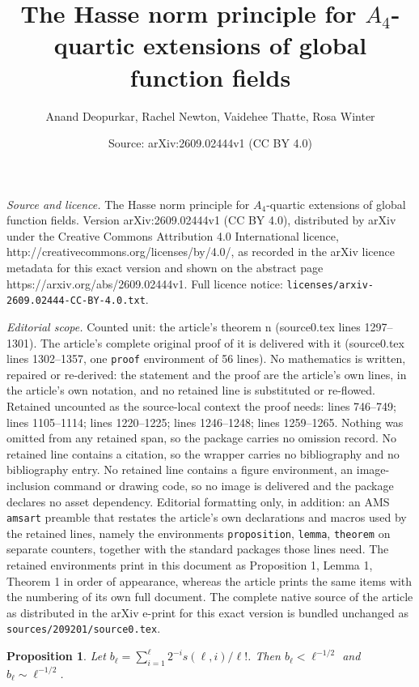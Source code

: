 \documentclass[10pt,a4paper]{amsart}
\title{The Hasse norm principle for $A_4$-quartic extensions of global function fields}
\author{Anand Deopurkar, Rachel Newton, Vaidehee Thatte, Rosa Winter}
\date{Source: arXiv:2609.02444v1 (CC BY 4.0)}
\newtheorem{proposition}{Proposition}
\begin{document}
\maketitle

\noindent\emph{Source and licence.} The Hasse norm principle for $A_4$-quartic extensions of global function fields. Version arXiv:2609.02444v1 (CC BY 4.0), distributed by arXiv under the Creative Commons Attribution 4.0 International licence, http://creativecommons.org/licenses/by/4.0/, as recorded in the arXiv licence metadata for this exact version and shown on the abstract page https://arxiv.org/abs/2609.02444v1. Full licence notice: \texttt{licenses/arxiv-2609.02444-CC-BY-4.0.txt}.\par\smallskip

\noindent\textit{Editorial scope.} Counted unit: the article's theorem n (source0.tex lines 1297--1301). The article's complete original proof of it is delivered with it (source0.tex lines 1302--1357, one \texttt{proof} environment of 56 lines). No mathematics is written, repaired or re-derived: the statement and the proof are the article's own lines, in the article's own notation, and no retained line is substituted or re-flowed.  Retained uncounted as the source-local context the proof needs: lines 746--749; lines 1105--1114; lines 1220--1225; lines 1246--1248; lines 1259--1265.  Nothing was omitted from any retained span, so the package carries no omission record.  No retained line contains a citation, so the wrapper carries no bibliography and no bibliography entry.  No retained line contains a figure environment, an image-inclusion command or drawing code, so no image is delivered and the package declares no asset dependency.  Editorial formatting only, in addition: an AMS \texttt{amsart} preamble that restates the article's own declarations and macros used by the retained lines, namely the environments \texttt{proposition}, \texttt{lemma}, \texttt{theorem} on separate counters, together with the standard packages those lines need.  The retained environments print in this document as Proposition 1, Lemma 1, Theorem 1 in order of appearance, whereas the article prints the same items with the numbering of its own full document.  The complete native source of the article as distributed in the arXiv e-print for this exact version is bundled unchanged as \texttt{sources/209201/source0.tex}.
\begin{proposition}\label{prop:sterlingapprox}
  Let \(b_\ell = \sum_{i = 1}^\ell 2^{-i} s(\ell,i)/\ell!\).
  Then \(b_\ell < \ell^{-1/2}\) and \(b_\ell \sim \ell^{-1/2}\).
\end{proposition}
\end{document}
